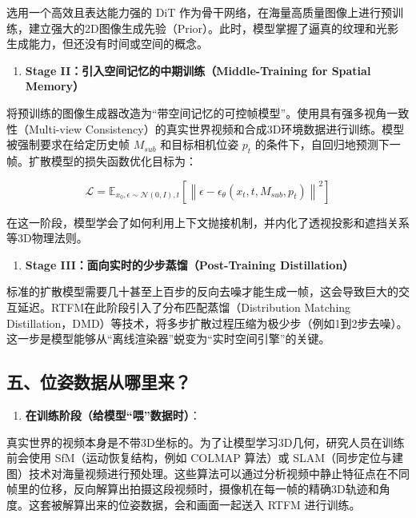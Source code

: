选用一个高效且表达能力强的 DiT 作为骨干网络，在海量高质量图像上进行预训练，建立强大的2D图像生成先验（Prior）。此时，模型掌握了逼真的纹理和光影生成能力，但还没有时间或空间的概念。

\begin{enumerate}
\def\labelenumi{\arabic{enumi}.}
\setcounter{enumi}{1}
\tightlist
\item
  \textbf{Stage II：引入空间记忆的中期训练（Middle-Training for Spatial Memory）}
\end{enumerate}

将预训练的图像生成器改造为``带空间记忆的可控帧模型''。使用具有强多视角一致性（Multi-view Consistency）的真实世界视频和合成3D环境数据进行训练。模型被强制要求在给定历史帧 \(M_{sub}\) 和目标相机位姿 \(p_t\) 的条件下，自回归地预测下一帧。扩散模型的损失函数优化目标为：

\[
\mathcal{L} = \mathbb{E}_{x_0,\epsilon \sim \mathcal{N}(0,I),t}\left[\left\lVert \epsilon - \epsilon_\theta(x_t,t,M_{sub},p_t) \right\rVert^2\right]
\]

在这一阶段，模型学会了如何利用上下文抛接机制，并内化了透视投影和遮挡关系等3D物理法则。

\begin{enumerate}
\def\labelenumi{\arabic{enumi}.}
\setcounter{enumi}{2}
\tightlist
\item
  \textbf{Stage III：面向实时的少步蒸馏（Post-Training Distillation）}
\end{enumerate}

标准的扩散模型需要几十甚至上百步的反向去噪才能生成一帧，这会导致巨大的交互延迟。RTFM在此阶段引入了分布匹配蒸馏（Distribution Matching Distillation，DMD）等技术，将多步扩散过程压缩为极少步（例如1到2步去噪）。这一步是模型能够从``离线渲染器''蜕变为``实时空间引擎''的关键。

\hypertarget{ux4e94ux4f4dux59ffux6570ux636eux4eceux54eaux91ccux6765}{%
\subsection{五、位姿数据从哪里来？}\label{ux4e94ux4f4dux59ffux6570ux636eux4eceux54eaux91ccux6765}}

\begin{enumerate}
\def\labelenumi{\arabic{enumi}.}
\tightlist
\item
  \textbf{在训练阶段（给模型``喂''数据时）}：
\end{enumerate}

真实世界的视频本身是不带3D坐标的。为了让模型学习3D几何，研究人员在训练前会使用 SfM（运动恢复结构，例如 COLMAP 算法）或 SLAM（同步定位与建图）技术对海量视频进行预处理。这些算法可以通过分析视频中静止特征点在不同帧里的位移，反向解算出拍摄这段视频时，摄像机在每一帧的精确3D轨迹和角度。这套被解算出来的位姿数据，会和画面一起送入 RTFM 进行训练。

